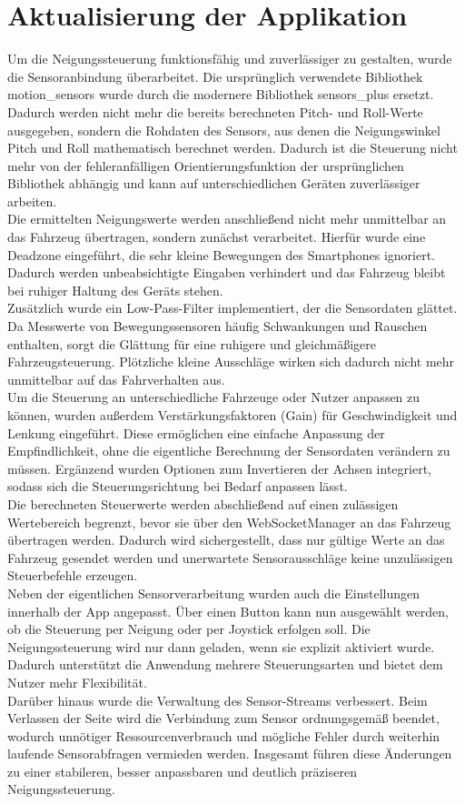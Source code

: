 \section{Aktualisierung der Applikation}
Um die Neigungssteuerung funktionsfähig und zuverlässiger zu gestalten, wurde die Sensoranbindung überarbeitet. Die ursprünglich verwendete Bibliothek motion\_sensors wurde durch die modernere Bibliothek sensors\_plus ersetzt. Dadurch werden nicht mehr die bereits berechneten Pitch- und Roll-Werte ausgegeben, sondern die Rohdaten des Sensors, aus denen die Neigungswinkel Pitch und Roll mathematisch berechnet werden. Dadurch ist die Steuerung nicht mehr von der fehleranfälligen Orientierungsfunktion der ursprünglichen Bibliothek abhängig und kann auf unterschiedlichen Geräten zuverlässiger arbeiten.
\\
Die ermittelten Neigungswerte werden anschließend nicht mehr unmittelbar an das Fahrzeug übertragen, sondern zunächst verarbeitet. Hierfür wurde eine Deadzone eingeführt, die sehr kleine Bewegungen des Smartphones ignoriert. Dadurch werden unbeabsichtigte Eingaben verhindert und das Fahrzeug bleibt bei ruhiger Haltung des Geräts stehen.
\\
Zusätzlich wurde ein Low-Pass-Filter implementiert, der die Sensordaten glättet. Da Messwerte von Bewegungssensoren häufig Schwankungen und Rauschen enthalten, sorgt die Glättung für eine ruhigere und gleichmäßigere Fahrzeugsteuerung. Plötzliche kleine Ausschläge wirken sich dadurch nicht mehr unmittelbar auf das Fahrverhalten aus.
\\
Um die Steuerung an unterschiedliche Fahrzeuge oder Nutzer anpassen zu können, wurden außerdem Verstärkungsfaktoren (Gain) für Geschwindigkeit und Lenkung eingeführt. Diese ermöglichen eine einfache Anpassung der Empfindlichkeit, ohne die eigentliche Berechnung der Sensordaten verändern zu müssen. Ergänzend wurden Optionen zum Invertieren der Achsen integriert, sodass sich die Steuerungsrichtung bei Bedarf anpassen lässt.
\\
Die berechneten Steuerwerte werden abschließend auf einen zulässigen Wertebereich begrenzt, bevor sie über den WebSocketManager an das Fahrzeug übertragen werden. Dadurch wird sichergestellt, dass nur gültige Werte an das Fahrzeug gesendet werden und unerwartete Sensorausschläge keine unzulässigen Steuerbefehle erzeugen.
\\
Neben der eigentlichen Sensorverarbeitung wurden auch die Einstellungen innerhalb der App angepasst. Über einen Button kann nun ausgewählt werden, ob die Steuerung per Neigung oder per Joystick erfolgen soll. Die Neigungssteuerung wird nur dann geladen, wenn sie explizit aktiviert wurde. Dadurch unterstützt die Anwendung mehrere Steuerungsarten und bietet dem Nutzer mehr Flexibilität.
\\
Darüber hinaus wurde die Verwaltung des Sensor-Streams verbessert. Beim Verlassen der Seite wird die Verbindung zum Sensor ordnungsgemäß beendet, wodurch unnötiger Ressourcenverbrauch und mögliche Fehler durch weiterhin laufende Sensorabfragen vermieden werden. Insgesamt führen diese Änderungen zu einer stabileren, besser anpassbaren und deutlich präziseren Neigungssteuerung.
